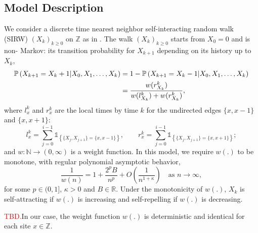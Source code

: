 \documentclass[twoside,12pt,a4paper]{article}
\numberwithin{equation}{section}
\newcommand\TBD{\textcolor{red}{TBD.}}
\begin{document}
	\subsection{Model Description} 
	We consider a discrete time nearest neighbor self-interacting random walk (SIRW) $(X_k)_{k\geq 0}$ on $\mathbb{Z}$ as in \cite{T96,KMP22}. The walk $(X_k)_{k\geq 0}$ starts from $X_0 = 0$ and is non- Markov: its transition probability for $X_{k+1}$ depending on its history up to $X_k$, 
	\begin{align}
		\mathbb{P}\left( X_{k+1} =  X_k+1 \middle| X_0, X_1,\dots, X_k   \right) 
		&=1- \mathbb{P}\left( X_{k+1} =  X_k-1 \middle| X_0, X_1,\dots, X_k   \right)  
		\notag
		\\
		&=  \frac{  w(r_{X_k}^k)}{ w(l_{X_k}^k)  + w(r_{X_k}^k)   }
		, \label{dynamic}
	\end{align}
	where $l_x^k$ and $r_x^k$ are the local times by time $k$ for the undirected edges $\{x,x-1\}$ and $\{x,x+1\}$:
	\[ 
	l_x^k = \sum_{j=0}^{i-1} \mathbb{1}_{ \left\{  \{X_j, X_{j+1}\} =  \{x,x-1\} \right\} }, \qquad
	r_x^k = \sum_{j=0}^{i-1} \mathbb{1}_{ \left\{  \{X_j, X_{j+1}\} =  \{x,x+1\} \right\} }   
	;\]
	and $
		w: \mathbb{N} \to  (0, \infty )
	$ 
	is a weight function.
	In this model, we require $w(.)$ to be monotone, with regular polynomial asymptotic behavior,
	\begin{equation}\label{eq: asymptotics of w}
		\frac{1}{w(n)} = 1 + \frac{2^p B}{n^p} + O\left(\frac{1}{n^{1+\mathcal{\kappa}}}\right) \quad \mbox{as $n\to \infty$}, 	
	\end{equation} 
	for some $p \in (0,1]$, $\kappa>0$ and $B\in \mathbb{R}$. Under the monotonicity of $w(.)$, $X_k$ is self-attracting if $w(.)$ is increasing and self-repelling if $w(. )$ is decreasing.

	\TBD In our case, the weight function $w(.)$ is deterministic and identical for each site $x\in \mathbb{Z}$.
\end{document}
